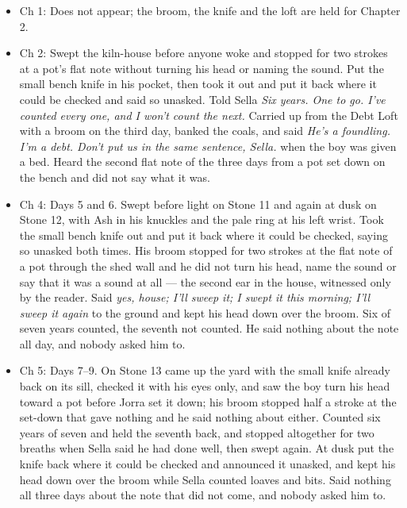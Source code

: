 \documentclass{design/chronicle}
\begin{document}
{
\begin{itemize}[leftmargin=1.4em,itemsep=1pt,topsep=3pt,parsep=0pt]

\item Ch 1: Does not appear; the broom, the knife and the loft are held for Chapter 2.

\item Ch 2: Swept the kiln-house before anyone woke and stopped for two strokes at a pot’s flat note without turning his head or naming the sound. Put the small bench knife in his pocket, then took it out and put it back where it could be checked and said so unasked. Told Sella \emph{Six years. One to go. I’ve counted every one, and I won’t count the next.} Carried up from the Debt Loft with a broom on the third day, banked the coals, and said \emph{He’s a foundling. I’m a debt. Don’t put us in the same sentence, Sella.} when the boy was given a bed. Heard the second flat note of the three days from a pot set down on the bench and did not say what it was.

\end{itemize}

\begin{itemize}[leftmargin=1.4em,itemsep=1pt,topsep=3pt,parsep=0pt]

\item Ch 4: Days 5 and 6. Swept before light on Stone 11 and again at dusk on Stone 12, with Ash in his knuckles and the pale ring at his left wrist. Took the small bench knife out and put it back where it could be checked, saying so unasked both times. His broom stopped for two strokes at the flat note of a pot through the shed wall and he did not turn his head, name the sound or say that it was a sound at all --- the second ear in the house, witnessed only by the reader. Said \emph{yes, house; I’ll sweep it; I swept it this morning; I’ll sweep it again} to the ground and kept his head down over the broom. Six of seven years counted, the seventh not counted. He said nothing about the note all day, and nobody asked him to.

\end{itemize}

\begin{itemize}[leftmargin=1.4em,itemsep=1pt,topsep=3pt,parsep=0pt]

\item Ch 5: Days 7--9. On Stone 13 came up the yard with the small knife already back on its sill, checked it with his eyes only, and saw the boy turn his head toward a pot before Jorra set it down; his broom stopped half a stroke at the set-down that gave nothing and he said nothing about either. Counted six years of seven and held the seventh back, and stopped altogether for two breaths when Sella said he had done well, then swept again. At dusk put the knife back where it could be checked and announced it unasked, and kept his head down over the broom while Sella counted loaves and bits. Said nothing all three days about the note that did not come, and nobody asked him to.


\end{itemize}}
\end{document}
